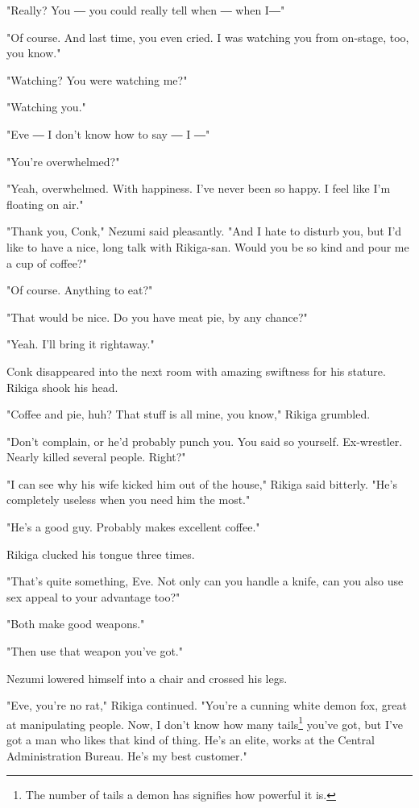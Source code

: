 "Really? You ― you could really tell when ― when I―"

"Of course. And last time, you even cried. I was watching you from
on-stage, too, you know."

"Watching? You were watching me?"

"Watching you."

"Eve ― I don't know how to say ― I ―"

"You're overwhelmed?"

"Yeah, overwhelmed. With happiness. I've never been so happy. I feel
like I'm floating on air."

"Thank you, Conk," Nezumi said pleasantly. "And I hate to disturb you,
but I'd like to have a nice, long talk with Rikiga-san. Would you be so
kind and pour me a cup of coffee?"

"Of course. Anything to eat?"

"That would be nice. Do you have meat pie, by any chance?"

"Yeah. I'll bring it rightaway."

Conk disappeared into the next room with amazing swiftness for his
stature. Rikiga shook his head.

"Coffee and pie, huh? That stuff is all mine, you know," Rikiga
grumbled.

"Don't complain, or he'd probably punch you. You said so yourself.
Ex-wrestler. Nearly killed several people. Right?"

"I can see why his wife kicked him out of the house," Rikiga said
bitterly. "He's completely useless when you need him the most."

"He's a good guy. Probably makes excellent coffee."

Rikiga clucked his tongue three times.

"That's quite something, Eve. Not only can you handle a knife, can you
also use sex appeal to your advantage too?"

"Both make good weapons."

"Then use that weapon you've got."

Nezumi lowered himself into a chair and crossed his legs.

"Eve, you're no rat," Rikiga continued. "You're a cunning white demon
fox, great at manipulating people. Now, I don't know how many tails\footnote{The number of tails a demon has signifies how powerful it is.}
you've got, but I've got a man who likes that kind of thing. He's an
elite, works at the Central Administration Bureau. He's my best
customer."

